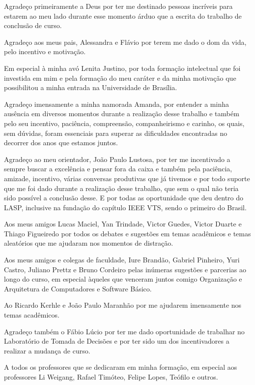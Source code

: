 Agradeço primeiramente a Deus por ter me destinado pessoas incríveis para estarem ao meu lado 
durante esse momento árduo que a escrita do trabalho de conclusão de curso. 

Agradeço aos meus pais, Alessandra e Flávio por terem me dado o dom da vida, pelo incentivo e motivação.

Em especial à minha avó Lenita Justino, por toda formação 
intelectual que foi investida em mim e pela formação do meu caráter e da minha motivação que possibilitou 
a minha entrada na Universidade de Brasília. 

Agradeço imensamente a minha namorada Amanda, por entender a minha ausência em diversos momentos durante a realização desse trabalho
e também pelo seu incentivo, paciência, compreensão, companheirismo e carinho,
os quais, sem dúvidas, foram essenciais para superar as dificuldades encontradas no decorrer
dos anos que estamos juntos.

Agradeço ao meu orientador, João Paulo Lustosa, por ter me incentivado a sempre buscar a excelência e pensar fora da caixa e também
pela paciência, amizade, incentivo, várias conversas produtivas que já tivemos e por todo suporte que me foi dado durante a realização desse 
trabalho, que sem o qual não teria sido possível a conclusão desse. E por todas as oportunidade que deu dentro do LASP, inclusive na fundação 
do capítulo IEEE VTS, sendo o primeiro do Brasil.

Aos meus amigos Lucas Maciel, Yan Trindade, Victor Guedes, Victor Duarte e Thiago Figueiredo por todos os debates e sugestões em temas acadêmicos 
e temas aleatórios que me ajudaram nos momentos de distração.

Aos meus amigos e colegas de faculdade, Iure Brandão, Gabriel Pinheiro, Yuri Castro, Juliano Prettz e 
Bruno Cordeiro pelas inúmeras sugestões e parcerias ao longo do curso, em especial àqueles que venceram juntos comigo Organização e Arquitetura
de Computadores e Software Básico.

Ao Ricardo Kerhle e João Paulo Maranhão por me ajudarem imensamente nos temas acadêmicos. 

Agradeço também o Fábio Lúcio por ter me dado oportunidade de trabalhar no Laboratório de Tomada de Decisões e por ter sido um
dos incentivadores a realizar a mudança de curso.

A todos os professores que se dedicaram em minha formação, em especial aos professores Li Weigang, Rafael Timóteo, Felipe Lopes, Teófilo e outros.

